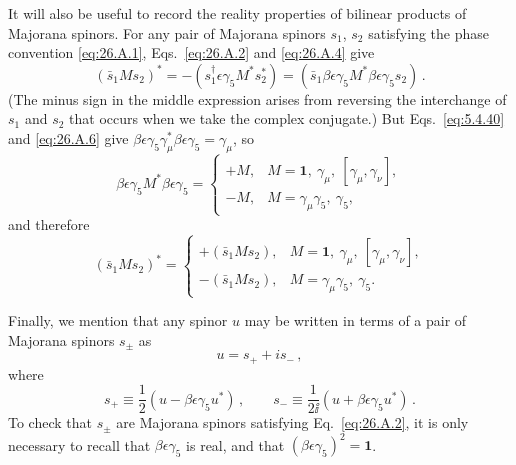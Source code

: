 It will also be useful to record the reality properties of bilinear products
of Majorana spinors. For any pair of Majorana spinors $s_1$, $s_2$ satisfying
the phase convention \eqref{eq:26.A.1}, Eqs.~\eqref{eq:26.A.2} and
\eqref{eq:26.A.4} give
\[
  (\bar{s}_1Ms_2)^*
  =-(s_1^\dagger\epsilon\gamma_5M^*s_2^*)
  =(\bar{s}_1\beta\epsilon\gamma_5M^*
     \beta\epsilon\gamma_5s_2)\,.
\]
(The minus sign in the middle expression arises from reversing the
interchange of $s_1$ and $s_2$ that occurs when we take the complex
conjugate.) But Eqs.~\eqref{eq:5.4.40} and \eqref{eq:26.A.6} give
$\beta\epsilon\gamma_5\gamma_\mu^*\beta\epsilon\gamma_5=\gamma_\mu$, so
\begin{equation}
  \beta\epsilon\gamma_5M^*\beta\epsilon\gamma_5
  =
  \begin{cases}
    +M,&M=\mathbf{1},\ \gamma_\mu,\ [\gamma_\mu,\gamma_\nu],\\
    -M,&M=\gamma_\mu\gamma_5,\ \gamma_5,
  \end{cases}
  \tag{26.A.20}\label{eq:26.A.20}
\end{equation}
and therefore
\begin{equation}
  (\bar{s}_1Ms_2)^*
  =
  \begin{cases}
    +(\bar{s}_1Ms_2),
      &M=\mathbf{1},\ \gamma_\mu,\ [\gamma_\mu,\gamma_\nu],\\
    -(\bar{s}_1Ms_2),
      &M=\gamma_\mu\gamma_5,\ \gamma_5.
  \end{cases}
  \tag{26.A.21}\label{eq:26.A.21}
\end{equation}

Finally, we mention that any spinor $u$ may be written in terms of a pair of
Majorana spinors $s_\pm$ as
\begin{equation}
  u=s_++is_-\,,
  \tag{26.A.22}\label{eq:26.A.22}
\end{equation}
where
\begin{equation}
  s_+\equiv\frac12(u-\beta\epsilon\gamma_5u^*)\,,
  \qquad
  s_-\equiv\frac1{2\ii}(u+\beta\epsilon\gamma_5u^*)\,.
  \tag{26.A.23}\label{eq:26.A.23}
\end{equation}
To check that $s_\pm$ are Majorana spinors satisfying
Eq.~\eqref{eq:26.A.2}, it is only necessary to recall that
$\beta\epsilon\gamma_5$ is real, and that
$(\beta\epsilon\gamma_5)^2=\mathbf{1}$.
